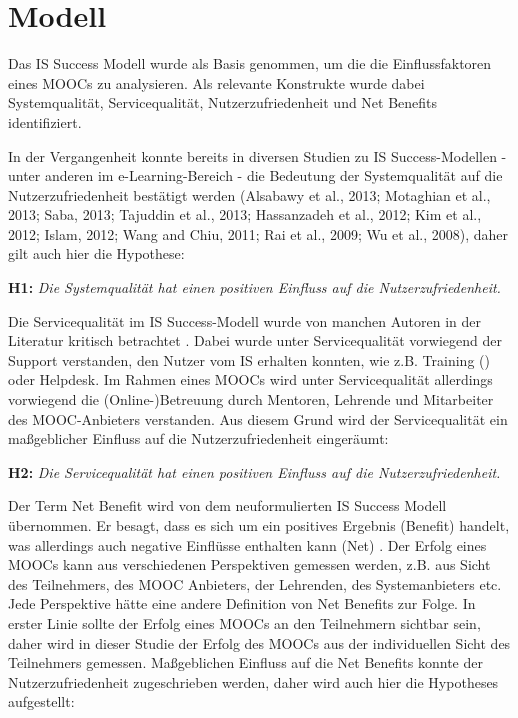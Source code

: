 \section{Modell}
\label{sec:modell}
Das IS Success Modell wurde als Basis genommen, um die die Einflussfaktoren eines MOOCs zu analysieren. Als relevante Konstrukte wurde dabei Systemqualität, Servicequalität, Nutzerzufriedenheit und Net Benefits identifiziert.  

In der Vergangenheit konnte bereits in diversen Studien zu IS Success-Modellen - unter anderen im e-Learning-Bereich - die Bedeutung der Systemqualität auf die Nutzerzufriedenheit bestätigt werden (Alsabawy et al., 2013; Motaghian et al., 2013; Saba, 2013; Tajuddin et al., 2013; Hassanzadeh et al., 2012; Kim et al., 2012; Islam, 2012; Wang and Chiu, 2011; Rai et al., 2009; Wu et al., 2008), daher gilt auch hier die Hypothese: 
  
\textbf{H1:} \textit{Die Systemqualität hat einen positiven Einfluss auf die Nutzerzufriedenheit.}

Die Servicequalität im IS Success-Modell wurde von manchen Autoren in der Literatur kritisch betrachtet . Dabei wurde unter Servicequalität vorwiegend der Support verstanden, den Nutzer vom IS erhalten konnten, wie z.B. Training (\parencite{petter2009meta}) oder Helpdesk. Im Rahmen eines MOOCs wird unter Servicequalität allerdings vorwiegend die (Online-)Betreuung durch Mentoren, Lehrende und Mitarbeiter des MOOC-Anbieters verstanden. Aus diesem Grund wird der Servicequalität ein maßgeblicher Einfluss auf die Nutzerzufriedenheit eingeräumt: 

\textbf{H2:} \textit{Die Servicequalität hat einen positiven Einfluss auf die Nutzerzufriedenheit.}

Der Term Net Benefit wird von dem neuformulierten IS Success Modell übernommen. Er besagt, dass es sich um ein positives Ergebnis (Benefit) handelt, was allerdings auch negative Einflüsse enthalten kann (Net) \parencite[vgl.][S.2974]{delone2002information}. Der Erfolg eines MOOCs kann aus verschiedenen Perspektiven gemessen werden, z.B. aus Sicht des Teilnehmers, des MOOC Anbieters, der Lehrenden, des Systemanbieters etc. Jede Perspektive hätte eine andere Definition von Net Benefits zur Folge. In erster Linie sollte der Erfolg eines MOOCs an den Teilnehmern sichtbar sein,  daher wird in dieser Studie der Erfolg des MOOCs aus der individuellen Sicht des Teilnehmers gemessen. Maßgeblichen Einfluss auf die Net Benefits konnte der Nutzerzufriedenheit zugeschrieben werden, daher wird auch hier die Hypotheses aufgestellt: 

